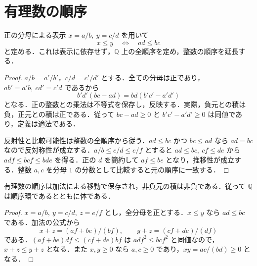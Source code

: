 \section{有理数の順序}
\begin{prop}[有理数体の順序]
正の分母による表示 $x=a/b,\ y=c/d$ を用いて
\[
 x\leq y\quad\Longleftrightarrow\quad ad\leq bc
\]
と定める．これは表示に依存せず，$\mathbb Q$ 上の全順序を定め，整数の順序を延長する．
\end{prop}
\begin{proof}
$a/b=a'/b'$，$c/d=c'/d'$ とする．全ての分母は正であり，$ab'=a'b,\ cd'=c'd$ であるから
\[
 b'd'(bc-ad)=bd(b'c'-a'd')
\]
となる．正の整数との乗法は不等式を保存し，反映する．実際，負元との積は負，正元との積は正である．従って $bc-ad\geq0$ と $b'c'-a'd'\geq0$ は同値であり，定義は適法である．

反射性と比較可能性は整数の全順序から従う．$ad\leq bc$ かつ $bc\leq ad$ なら $ad=bc$ なので反対称性が成立する．$a/b\leq c/d\leq e/f$ とすると $ad\leq bc,\ cf\leq de$ から $adf\leq bcf\leq bde$ を得る．正の $d$ を簡約して $af\leq be$ となり，推移性が成立する．整数 $a,c$ を分母 $1$ の分数として比較すると元の順序に一致する．
\end{proof}
\begin{prop}[順序と体演算の整合性]
有理数の順序は加法による移動で保存され，非負元の積は非負である．従って $\mathbb Q$ は順序環であるとともに体である．
\end{prop}
\begin{proof}
$x=a/b,\ y=c/d,\ z=e/f$ とし，全分母を正とする．$x\leq y$ なら $ad\leq bc$ である．加法の公式から
\[
 x+z=(af+be)/(bf),\qquad y+z=(cf+de)/(df)
\]
である．$(af+be)df\leq(cf+de)bf$ は $adf^2\leq bcf^2$ と同値なので，$x+z\leq y+z$ となる．また $x,y\geq0$ なら $a,c\geq0$ であり，$xy=ac/(bd)\geq0$ となる．
\end{proof}
